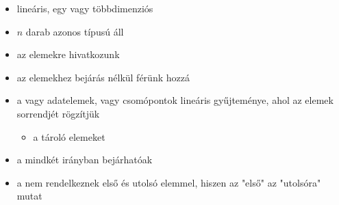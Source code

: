 \documentclass[main.tex]{subfiles}
\begin{document}
  \begin{itemize}
    \item lineáris, egy vagy többdimenziós
    
    \item $n$ darab azonos típusú  áll
    
    \item az elemekre  hivatkozunk
    
    \item az elemekhez bejárás nélkül férünk hozzá
  \end{itemize}

  \begin{itemize}
    \item a  vagy 
    adatelemek, vagy csomópontok lineáris gyűjteménye,
    ahol az elemek sorrendjét rögzítjük
    \begin{itemize}
      \item a  tároló elemeket
    \end{itemize}

    \item a  mindkét irányban bejárhatóak
    
    \item a  nem rendelkeznek
    első és utolsó elemmel, hiszen az "első" az "utolsóra" mutat
  \end{itemize}
\end{document}
